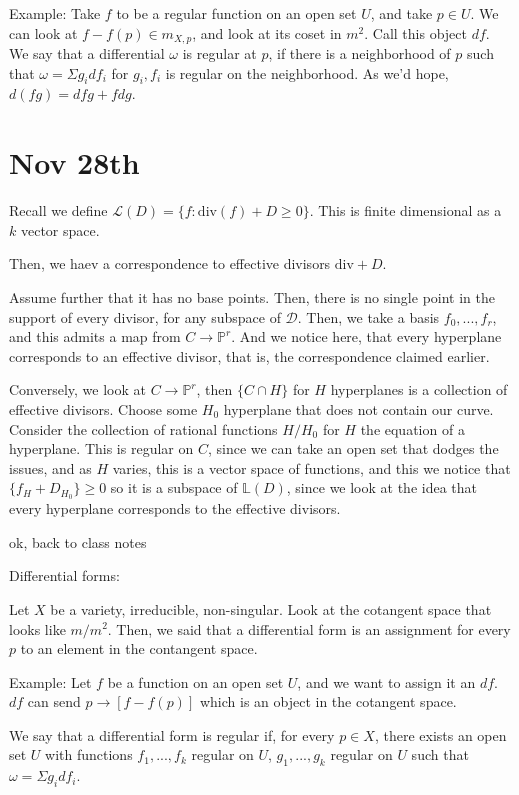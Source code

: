 \documentclass[10pt]{article}
\begin{document}
Example: Take $f$ to be a regular function on an open set $U$, and take $p \in U$. We can look at $f - f(p) \in m_{X,p}$, and look at its coset in $m^2$. Call this object $df$. We say that a differential $\omega$ is regular at $p$, if there is a neighborhood of $p$ such that $\omega = \Sigma g_i df_i$ for $g_i, f_i$ is regular on the neighborhood. As we’d hope, $d(fg) = df g + f dg$.

\section{Nov 28th}

Recall we define $\mathcal{L}(D) = \{ f: \text{div}(f) + D \geq 0 \}$. This is finite dimensional as a $k$ vector space. 

Then, we haev a correspondence to effective divisors $\text{div} + D$.

Assume further that it has no base points. Then, there is no single point in the support of every divisor, for any subspace of $\mathcal{D}$. Then, we take a basis $f_0,...,f_r$, and this admits a map from $C \to \mathbb{P}^r$. And we notice here, that every hyperplane corresponds to an effective divisor, that is, the correspondence claimed earlier.

Conversely, we look at $C \to \mathbb{P}^r$, then $\{C \cap H \}$ for $H$ hyperplanes is a collection of effective divisors. Choose some $H_0$ hyperplane that does not contain our curve. Consider the collection of rational functions $H/H_0$ for $H$ the equation of a hyperplane. This is regular on $C$, since we can take an open set that dodges the issues, and as $H$ varies, this is a vector space of functions, and this we notice that $\{ f_H + D_{H_0} \} \geq 0$ so it is a subspace of $\mathbb{L}(D)$, since we look at the idea that every hyperplane corresponds to the effective divisors.

ok, back to class notes

Differential forms:

Let $X$ be a variety, irreducible, non-singular. Look at the cotangent space that looks like $m/m^2$. Then, we said that a differential form is an assignment for every $p$ to an element in the contangent space. 

Example: Let $f$ be a function on an open set $U$, and we want to assign it an $df$. $df$ can send $p \to [ f - f(p) ]$ which is an object in the cotangent space.

We say that a differential form is regular if, for every $p \in X$, there exists an open set $U$ with functions $f_1,...,f_k$ regular on $U$, $g_1,...,g_k$ regular on $U$ such that $\omega = \Sigma g_i df_i$.
\end{document}
